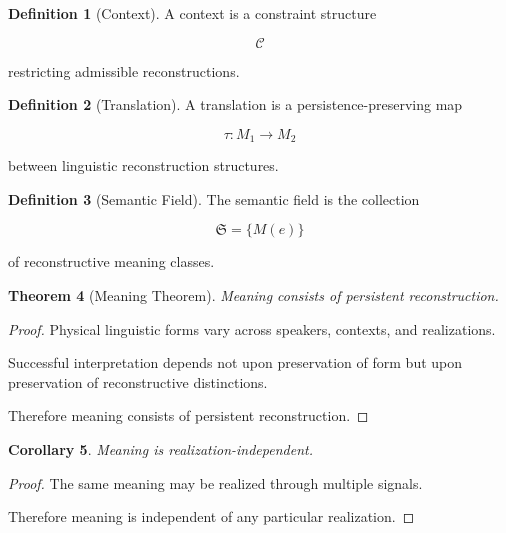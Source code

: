 \documentclass[12pt,oneside]{article}
\newtheorem{theorem}{Theorem}[section] \newtheorem{lemma}[theorem]{Lemma} \newtheorem{proposition}[theorem]{Proposition} \newtheorem{corollary}[theorem]{Corollary}
\theoremstyle{definition}
\newtheorem{definition}[theorem]{Definition} \newtheorem{axiom}[theorem]{Axiom} \newtheorem{remark}[theorem]{Remark} \newtheorem{example}[theorem]{Example}
\begin{document}
\begin{definition}[Context]

A context is a constraint structure

\[
\mathcal C
\]

restricting admissible reconstructions.

\end{definition}

\begin{definition}[Translation]

A translation is a persistence-preserving map

\[
\tau :
M_1
\rightarrow
M_2
\]

between linguistic reconstruction structures.

\end{definition}

\begin{definition}[Semantic Field]

The semantic field is the collection

\[
\mathfrak S
=
\{M(e)\}
\]

of reconstructive meaning classes.

\end{definition}

\begin{theorem}[Meaning Theorem]

Meaning consists of persistent reconstruction.

\end{theorem}

\begin{proof}

Physical linguistic forms vary across speakers, contexts, and realizations.

Successful interpretation depends not upon preservation of form but upon preservation of reconstructive distinctions.

Therefore meaning consists of persistent reconstruction.

\end{proof}

\begin{corollary}

Meaning is realization-independent.

\end{corollary}

\begin{proof}

The same meaning may be realized through multiple signals.

Therefore meaning is independent of any particular realization.

\end{proof}
\end{document}
